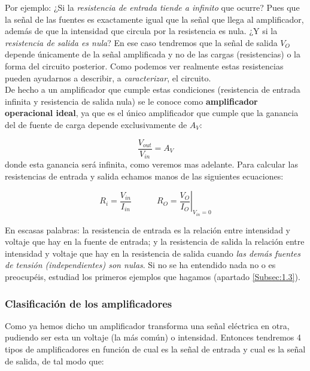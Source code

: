 \documentclass[12pt,a4paper]{article}
\numberwithin{equation}{section}
\numberwithin{figure}{section}
\newcommand{\tquad}{\quad \quad \quad}
\begin{document}
Por ejemplo: ¿Si la \textit{resistencia de entrada tiende a infinito} que ocurre? Pues que la señal de las fuentes es exactamente igual que la señal que llega al amplificador, además de que la intensidad que circula por la resistencia es nula. ¿Y si la \textit{resistencia de salida es nula}? En ese caso tendremos que la señal de salida $V_O$ depende únicamente de la señal amplificada y no de las cargas (resistencias) o la forma del circuito posterior. Como podemos ver realmente estas resistencias pueden ayudarnos a describir, a \textit{caracterizar}, el circuito. \\

De hecho a un amplificador que cumple estas condiciones (resistencia de entrada infinita y resistencia de salida nula) se le conoce como \textbf{amplificador operacional ideal}, ya que es el único amplificador que cumple que la ganancia del de fuente de carga depende exclusivamente de $A_V$: 

\begin{equation}
\dfrac{V_{out}}{V_{in}} = A_V
\end{equation}
donde esta ganancia será infinita, como veremos mas adelante. Para calcular las resistencias de entrada y salida echamos manos de las siguientes ecuaciones:

\begin{equation}
R_i = \dfrac{V_{in}}{I_{in}} \tquad R_O = \left. \dfrac{V_O}{I_O} \right|_{V_{in}=0}
\end{equation}

En escasas palabras: la resistencia de entrada es la relación entre intensidad y voltaje que hay en la fuente de entrada; y la resistencia de salida la relación entre intensidad y voltaje que hay en la resistencia de salida cuando \textit{las demás fuentes de tensión (independientes) son nulas}. Si no se ha entendido nada no o es preocupéis, estudiad los primeros ejemplos que hagamos (apartado \ref{Subsec:1.3}).



\subsubsection{Clasificación de los amplificadores}

Como ya hemos dicho un amplificador transforma una señal eléctrica en otra, pudiendo ser esta un voltaje (la más común) o intensidad. Entonces tendremos 4 tipos de amplificadores en función de cual es la señal de entrada y cual es la señal de salida, de tal modo que:
\end{document}
